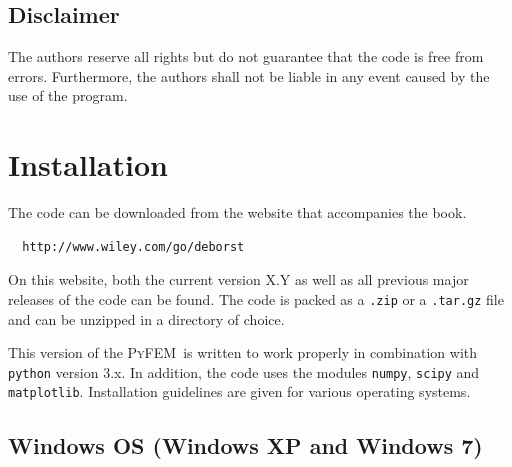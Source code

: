 \documentclass{article}
\newcommand{\progname}{\textsc{PyFEM}}
\begin{document}
\subsection*{Disclaimer}

\noindent
The authors reserve all rights but do not guarantee that the code is    
free from errors. Furthermore, the authors shall not be liable in any   
event caused by the use of the program.                                 

\section{Installation}

The code can be downloaded from the website that accompanies the book.

\begin{verbatim}
  http://www.wiley.com/go/deborst
\end{verbatim}
\noindent
On this website, both the current version X.Y as well as all previous major releases of the code
can be found. The code is packed as a \texttt{.zip} or a \texttt{.tar.gz} file and 
can be unzipped in a directory of choice. 

This version of the \progname~is written to work properly in combination with 
\texttt{python} version 3.x. In addition, the code uses the modules \texttt{numpy}, \texttt{scipy} and
\texttt{matplotlib}. Installation guidelines are given for various operating systems.

\subsection{Windows OS (Windows XP and Windows 7)}
\end{document}
